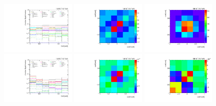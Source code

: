 \begin{figure}[htb]
\begin{center}
 \includegraphics[width=0.32\textwidth]{fig_fullRun2UL/unfolding/combined/deltaSystCombinedlog_rebinnedB_c_nn.pdf}
 \includegraphics[width=0.32\textwidth]{fig_fullRun2UL/unfolding/combined/StatCovMatrix_rebinnedB_c_nn.pdf}
 \includegraphics[width=0.32\textwidth]{fig_fullRun2UL/unfolding/combined/TotalSystCovMatrix_rebinnedB_c_nn.pdf} \\
 \includegraphics[width=0.32\textwidth]{fig_fullRun2UL/unfolding/combined/deltaSystCombinedlogNorm_rebinnedB_c_nn.pdf}
 \includegraphics[width=0.32\textwidth]{fig_fullRun2UL/unfolding/combined/StatCovMatrixNorm_rebinnedB_c_nn.pdf}
 \includegraphics[width=0.32\textwidth]{fig_fullRun2UL/unfolding/combined/TotalSystCovMatrixNorm_rebinnedB_c_nn.pdf} \\

\end{center}
\end{figure}
